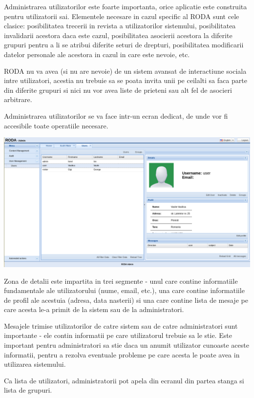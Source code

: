 Administrarea utilizatorilor este foarte importanta, orice aplicatie
este construita pentru utilizatorii sai. Elementele necesare in cazul
specific al RODA sunt cele clasice: posibilitatea trecerii in revista
a utilizatorilor sistemului, posibilitatea invalidarii acestora daca
este cazul, posibilitatea asocierii acestora la diferite grupuri pentru
a li se atribui diferite seturi de drepturi, posibilitatea modificarii
datelor personale ale acestora in cazul in care este nevoie, etc. 

RODA nu va avea (si nu are nevoie) de un sistem avansat de interactiune
sociala intre utilizatori, acestia nu trebuie sa se poata invita unii
pe ceilalti sa faca parte din diferite grupuri si nici nu vor avea
liste de prieteni sau alt fel de asocieri arbitrare. 

Administrarea utilizatorilor se va face intr-un ecran dedicat, de
unde vor fi accesibile toate operatiile necesare. 

\includegraphics[width=15cm]{user/user1}

Zona de detalii este impartita in trei segmente - unul care contine
informatiile fundamentale ale utilizatorului (nume, email, etc.),
una care contine informatiile de profil ale acestuia (adresa, data
nasterii) si una care contine lista de mesaje pe care acesta le-a
primit de la sistem sau de la administratori. 

Mesajele trimise utilizatorilor de catre sistem sau de catre administratori
sunt importante - ele contin informatii pe care utilizatorul trebuie
sa le stie. Este important pentru administratori sa stie daca un anumit
utilizator cunoaste aceste informatii, pentru a rezolva eventuale
probleme pe care acesta le poate avea in utilizarea sistemului.

Ca lista de utilizatori, administratorii pot apela din ecranul din
partea stanga si lista de grupuri. 

